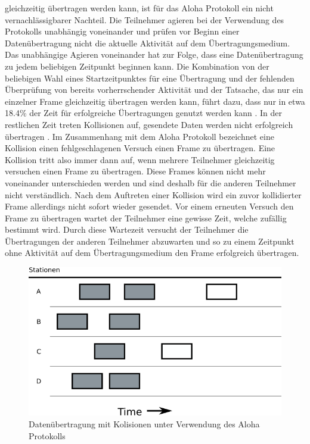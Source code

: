 gleichzeitig übertragen werden kann, ist für das Aloha Protokoll ein nicht vernachlässigbarer Nachteil. Die Teilnehmer agieren bei der Verwendung des Protokolls unabhängig voneinander und prüfen vor Beginn einer Datenübertragung nicht die aktuelle Aktivität auf dem Übertragungsmedium. Das unabhängige Agieren voneinander hat zur Folge, dass eine Datenübertragung zu jedem beliebigen Zeitpunkt beginnen kann. Die Kombination von der beliebigen Wahl eines Startzeitpunktes für eine Übertragung und der fehlenden Überprüfung von bereits vorherrschender Aktivität und der Tatsache, das nur ein einzelner Frame gleichzeitig übertragen werden kann, führt dazu, dass nur in etwa 18.4\% der Zeit für erfolgreiche Übertragungen genutzt werden kann \cite{Back_AlohaPure}. In der restlichen Zeit treten Kollisionen auf, gesendete Daten werden nicht erfolgreich übertragen \cite{Back_AlohaPure}. Im Zusammenhang mit dem Aloha Protokoll bezeichnet eine Kollision einen fehlgeschlagenen Versuch einen Frame zu übertragen. Eine Kollision tritt also immer dann auf, wenn mehrere Teilnehmer gleichzeitig versuchen einen Frame zu übertragen. Diese Frames können nicht mehr voneinander unterschieden werden und sind deshalb für die anderen Teilnehmer nicht verständlich. Nach dem Auftreten einer Kollision wird ein zuvor kollidierter Frame allerdings nicht sofort wieder gesendet. Vor einem erneuten Versuch den Frame zu übertragen wartet der Teilnehmer eine gewisse Zeit, welche zufällig bestimmt wird. Durch diese Wartezeit versucht der Teilnehmer die Übertragungen der anderen Teilnehmer abzuwarten und so zu einem Zeitpunkt ohne Aktivität auf dem Übertragungsmedium den Frame erfolgreich übertragen.
\begin{figure}[h!]
	\begin{center}
	\includegraphics[scale=0.6]{img/ZeichnungExport2.png}
	\caption{Datenübertragung mit Kolisionen unter Verwendung des Aloha Protokolls}
	\end{center}
	\label{Abb2_PureAloha}
\end{figure}

